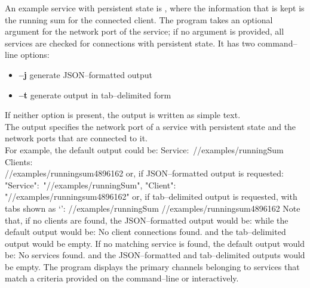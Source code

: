 An example service with persistent state is
, where the information that is kept is the
running sum for the connected client.
The program takes an optional argument for the \yarp{} network port of the service; if no
argument is provided, all services are checked for connections with persistent state.
It has two command--line options:
\begin{itemize}
\item \textbf{--j} generate JSON--formatted output
\item \textbf{--t} generate output in tab--delimited form
\end{itemize}
If neither option is present, the output is written as simple text.\\

The output specifies the \yarp{} network port of a service with persistent state and the
\yarp{} network ports that are connected to it.\\

For example, the default output could be:
\outputBegin{}
Service:\ /\serviceName/examples/runningSum\\
\settowidth{\utilLen}{Cli}%
Clients:\\
\hspace*{\utilLen}/\clientName/examples/runningsum\textunderscore{}4896162
\outputEnd{}
or, if JSON--formatted output is requested:
\outputBegin{}
\openSq{} \textbraceleft{} "Service":\ "/\serviceName/examples/runningSum", "Client":\ \\
"/\clientName/examples/runningsum\textunderscore{}4896162" \textbraceright{} \closeSq
\outputEnd{}
or, if tab--delimited output is requested, with tabs shown as
`\texttt{\boldmath{$\vdash$}}':
\outputBegin{}
/\serviceName/examples/runningSum\pseudotab{}%
/\clientName/examples/runningsum\textunderscore{}4896162
\outputEnd{}
Note that, if no clients are found, the JSON--formatted output would be:
\outputBegin{}
\sqPair
\outputEnd{}
while the default output would be:
\outputBegin{}
No client connections found.
\outputEnd{}
and the tab--delimited output would be empty.
If no matching service is found, the default output would be:
\outputBegin{}
No services found.
\outputEnd{}
and the JSON--formatted and tab--delimited outputs would be empty.
The program  displays the primary channels belonging to
services that match a criteria provided on the command--line or interactively.\\

